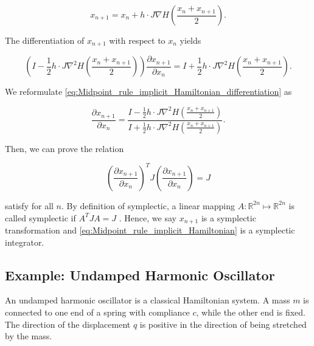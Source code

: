 \documentclass[
	parskip, 			   %
	twoside, 			   %
	DIV=14, 			   %
	BCOR=15.0mm, 		   %
	headsepline, 		   %
	open=right, 		   %
	captions=tableheading, %
	bibliography=totoc,    %
	numbers=noenddot       %
]{scrreprt}
\begin{document}
\begin{equation}
    \label{eq:Midpoint_rule_implicit_Hamiltonian}
    x_{n+1} = x_{n} + h \cdot J \nabla H \left(\frac{x_{n} + x_{n+1}}{2}\right).
\end{equation}

The differentiation of $x_{n+1}$ with respect to $x_{n}$ yields

\begin{equation}
    \label{eq:Midpoint_rule_implicit_Hamiltonian_differentiation}
    \left(I - \frac{1}{2} h \cdot J \nabla^2 H\left(\frac{x_{n} + x_{n+1}}{2}\right) \right) \frac{\partial x_{n+1}}{\partial x_{n}} = I + \frac{1}{2} h \cdot J \nabla^2 H\left(\frac{x_{n} + x_{n+1}}{2}\right).
\end{equation}

We reformulate \ref{eq:Midpoint_rule_implicit_Hamiltonian_differentiation} as

\begin{equation}
    \frac{\partial x_{n+1}}{\partial x_{n}} = \frac{I - \frac{1}{2} h \cdot J \nabla^2 H\left(\frac{x_{n} + x_{n+1}}{2}\right) }{I + \frac{1}{2} h \cdot J \nabla^2 H\left(\frac{x_{n} + x_{n+1}}{2}\right)} .
\end{equation}

Then, we can prove the relation

\begin{equation}
    \label{eq:Midpoint_rule_implicit_symplecticity}
    \left(\frac{\partial x_{n+1}}{\partial x_{n}}\right)^T J \left(\frac{\partial x_{n+1}}{\partial x_{n}}\right) = J
\end{equation}

satisfy for all $n$. By definition of symplectic, a linear mapping $A: \mathbb{R}^{2n} \mapsto \mathbb{R}^{2n}$ is called symplectic if $A^T J A = J$ \cite{hairer2006geometric}. Hence, we say $x_{n+1}$ is a symplectic transformation and \ref{eq:Midpoint_rule_implicit_Hamiltonian} is a symplectic integrator.


\subsection{Example: Undamped Harmonic Oscillator}
An undamped harmonic oscillator is a classical Hamiltonian system. A mass $m$ is connected to one end of a spring with compliance $c$, while the other end is fixed. The direction of the displacement $q$ is positive in the direction of being stretched by the mass.
\end{document}
